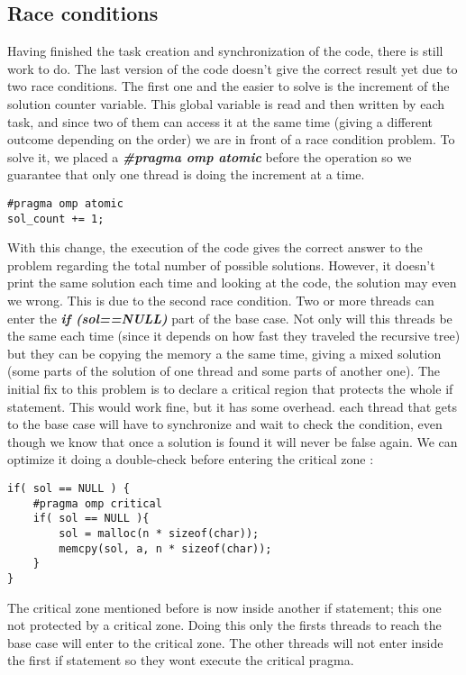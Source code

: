 \subsection{Race conditions}
Having finished the task creation and synchronization of the code, there is still work to do. The last version of the code doesn't give the correct result yet due to two race conditions. The first one and the easier to solve is the increment of the solution counter variable. This global variable is read and then written by each task, and since two of them can access it at the same time (giving a different outcome depending on the order) we are in front of a race condition problem.
\justify
To solve it, we placed a \textbf{\textit{\#pragma omp atomic}} before the operation so we guarantee that only one thread is doing the increment at a time.
\begin{lstlisting}
#pragma omp atomic
sol_count += 1;
\end{lstlisting}
\justify
With this change, the execution of the code gives the correct answer to the problem regarding the total number of possible solutions. However, it doesn't print the same solution each time and looking at the code, the solution may even we wrong.
\justify
This is due to the second race condition. Two or more threads can enter the \textbf{\textit{if (sol==NULL)}} part of the base case. Not only will this threads be the same each time (since it depends on how fast they traveled the recursive tree) but they can be copying the memory a the same time, giving a mixed solution (some parts of the solution of one thread and some parts of another one).
\justify
The initial fix to this problem is to declare a critical region that protects the whole if statement. This would work fine, but it has some overhead. each thread that gets to the base case will have to synchronize and wait to check the condition, even though we know that once a solution is found it will never be false again. We can optimize it doing a double-check before entering the critical zone : 
\begin{lstlisting}
if( sol == NULL ) {
    #pragma omp critical
    if( sol == NULL ){
        sol = malloc(n * sizeof(char));
        memcpy(sol, a, n * sizeof(char));
    }
}
\end{lstlisting}
\justify
The critical zone mentioned before is now inside another if statement; this one not protected by a critical zone. Doing this only the firsts threads to reach the base case will enter to the critical zone. The other threads will not enter inside the first if statement so they wont execute the critical pragma.

